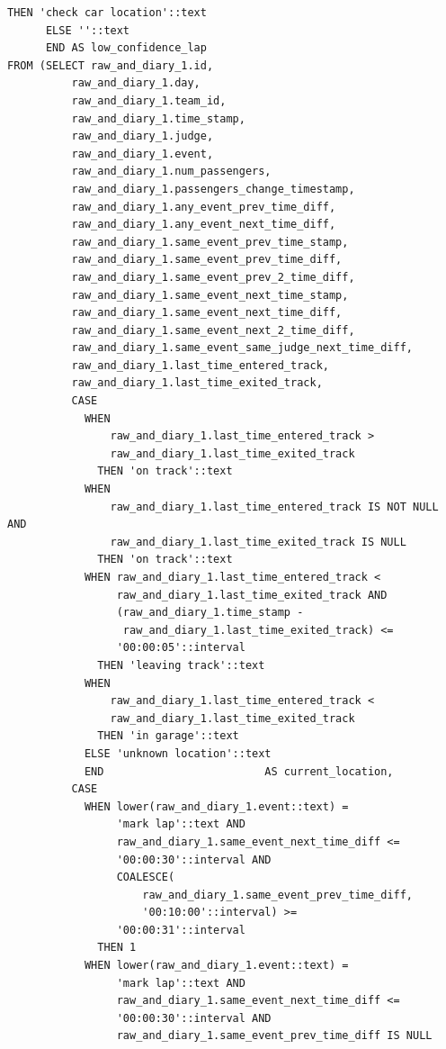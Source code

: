 \documentclass[11pt]{article}
\begin{document}
\begin{lstlisting}[style=sql, caption={Full Audit query}, label={lst:sql_audit_query}]
        THEN 'check car location'::text
      ELSE ''::text
      END AS low_confidence_lap
FROM (SELECT raw_and_diary_1.id,
          raw_and_diary_1.day,
          raw_and_diary_1.team_id,
          raw_and_diary_1.time_stamp,
          raw_and_diary_1.judge,
          raw_and_diary_1.event,
          raw_and_diary_1.num_passengers,
          raw_and_diary_1.passengers_change_timestamp,
          raw_and_diary_1.any_event_prev_time_diff,
          raw_and_diary_1.any_event_next_time_diff,
          raw_and_diary_1.same_event_prev_time_stamp,
          raw_and_diary_1.same_event_prev_time_diff,
          raw_and_diary_1.same_event_prev_2_time_diff,
          raw_and_diary_1.same_event_next_time_stamp,
          raw_and_diary_1.same_event_next_time_diff,
          raw_and_diary_1.same_event_next_2_time_diff,
          raw_and_diary_1.same_event_same_judge_next_time_diff,
          raw_and_diary_1.last_time_entered_track,
          raw_and_diary_1.last_time_exited_track,
          CASE
            WHEN
                raw_and_diary_1.last_time_entered_track >
                raw_and_diary_1.last_time_exited_track
              THEN 'on track'::text
            WHEN
                raw_and_diary_1.last_time_entered_track IS NOT NULL AND
                raw_and_diary_1.last_time_exited_track IS NULL
              THEN 'on track'::text
            WHEN raw_and_diary_1.last_time_entered_track <
                 raw_and_diary_1.last_time_exited_track AND
                 (raw_and_diary_1.time_stamp -
                  raw_and_diary_1.last_time_exited_track) <=
                 '00:00:05'::interval
              THEN 'leaving track'::text
            WHEN
                raw_and_diary_1.last_time_entered_track <
                raw_and_diary_1.last_time_exited_track
              THEN 'in garage'::text
            ELSE 'unknown location'::text
            END                         AS current_location,
          CASE
            WHEN lower(raw_and_diary_1.event::text) =
                 'mark lap'::text AND
                 raw_and_diary_1.same_event_next_time_diff <=
                 '00:00:30'::interval AND
                 COALESCE(
                     raw_and_diary_1.same_event_prev_time_diff,
                     '00:10:00'::interval) >=
                 '00:00:31'::interval
              THEN 1
            WHEN lower(raw_and_diary_1.event::text) =
                 'mark lap'::text AND
                 raw_and_diary_1.same_event_next_time_diff <=
                 '00:00:30'::interval AND
                 raw_and_diary_1.same_event_prev_time_diff IS NULL

\end{lstlisting}
\end{document}
